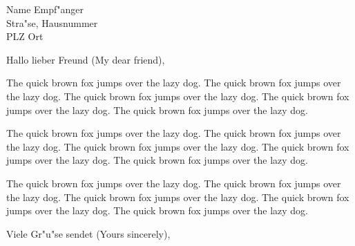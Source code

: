 \documentclass[a4paper,11pt,addresshigh]{dinbrief}
\begin{document}
\begin{letter}{Name Empf"anger\\Stra"se, Hausnummer\\PLZ Ort}
\subject{\textbf{Betreff (Subject)}}
\opening{Hallo lieber Freund (My dear friend),}

The quick brown fox jumps over the lazy dog. The quick brown fox jumps over the lazy dog. The quick brown fox jumps over the lazy dog. The quick brown fox jumps over the lazy dog. The quick brown fox jumps over the lazy dog.

The quick brown fox jumps over the lazy dog. The quick brown fox jumps over the lazy dog. The quick brown fox jumps over the lazy dog. The quick brown fox jumps over the lazy dog. The quick brown fox jumps over the lazy dog.

The quick brown fox jumps over the lazy dog. The quick brown fox jumps over the lazy dog. The quick brown fox jumps over the lazy dog. The quick brown fox jumps over the lazy dog. The quick brown fox jumps over the lazy dog.



\closing[]{Viele Gr"u"se sendet (Yours sincerely),}
\end{letter}
\end{document}
